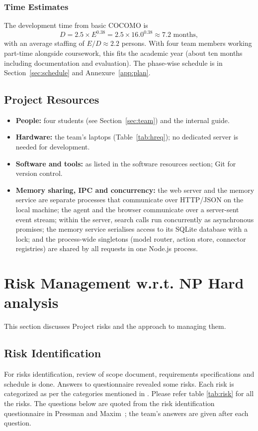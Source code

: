 \subsubsection{Time Estimates}
The development time from basic COCOMO is
\[ D = 2.5 \times E^{0.38} = 2.5 \times 16.0^{0.38} \approx 7.2 \mbox{ months}, \]
with an average staffing of $E/D \approx 2.2$ persons. With four team members working part-time alongside coursework, this fits the academic year (about ten months including documentation and evaluation). The phase-wise schedule is in Section~\ref{sec:schedule} and Annexure~\ref{app:plan}.


\subsection{Project Resources}
\begin{itemize}
\item \textbf{People:} four students (see Section~\ref{sec:team}) and the internal guide.
\item \textbf{Hardware:} the team's laptops (Table~\ref{tab:hreq}); no dedicated server is needed for development.
\item \textbf{Software and tools:} as listed in the software resources section; Git for version control.
\item \textbf{Memory sharing, IPC and concurrency:} the web server and the memory service are separate processes that communicate over HTTP/JSON on the local machine; the agent and the browser communicate over a server-sent event stream; within the server, search calls run concurrently as asynchronous promises; the memory service serialises access to its SQLite database with a lock; and the process-wide singletons (model router, action store, connector registries) are shared by all requests in one Node.js process.
\end{itemize}

\section{Risk Management w.r.t. NP Hard analysis}
This section discusses Project risks and the approach to managing them.
\subsection{Risk Identification}
For risks identification, review of scope document, requirements specifications and schedule is done. Answers to questionnaire revealed some risks. Each risk is categorized as per the categories mentioned in \cite{bookPressman}. Please refer table \ref{tab:risk} for all the risks. The questions below are quoted from the risk identification questionnaire in Pressman and Maxim~\cite{bookPressman}; the team's answers are given after each question.

